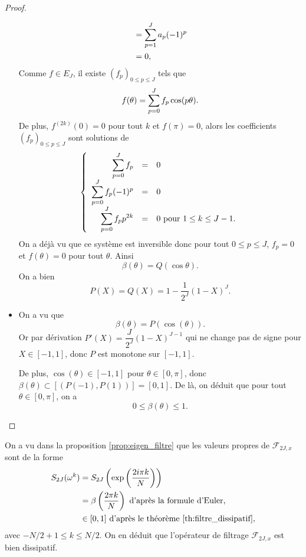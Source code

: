 \begin{proof}
\begin{itemize}
\begin{align*}
	& = \displaystyle\sum\limits_{p=1}^J a_p(-1)^p \\
	& = 0,
\end{align*}
Comme $f \in E_J$, il existe $(f_p)_{0 \leq p \leq J}$ tels que
\begin{equation}
f(\theta) = \displaystyle\sum\limits_{p=0}^J f_p \cos (p \theta).
\end{equation}
De plus, $f^{(2k)}(0)=0$ pour tout $k$ et $f(\pi)=0$, alors les coefficients $(f_p)_{0 \leq p \leq J}$ sont solutions de 
\begin{equation}
\left\lbrace
\begin{array}{rcl}
\displaystyle\sum\limits_{p=0}^J f_p & = & 0 \\
\displaystyle\sum\limits_{p=0}^J f_p (-1)^p & = & 0 \\
\displaystyle\sum\limits_{p=0}^J f_p p^{2k} & = & 0 \text{ pour } 1 \leq k \leq J-1.
\end{array}
\right.
\end{equation}
On a déjà vu que ce système est inversible donc pour tout $0 \leq p \leq J$, $f_p = 0$ et $f(\theta) = 0$ pour tout $\theta$. Ainsi 
\begin{equation}
\beta(\theta) = Q(\cos\theta).
\end{equation}
On a bien
\begin{equation}
P(X) = Q(X) = 1-\dfrac{1}{2^J}(1-X)^J.
\end{equation}

\item On a vu que
\begin{equation}
\beta(\theta) = P(\cos (\theta)).
\end{equation}
Or par dérivation $P'(X) =  \dfrac{J}{2^J}(1-X)^{J-1}$ qui ne change pas de signe pour $X \in [-1,1]$, donc $P$ est monotone sur $[-1,1]$.

De plus, $\cos(\theta) \in [-1,1]$ pour $\theta \in [0, \pi]$, donc $\beta(\theta) \subset [(P(-1), P(1))] = [0,1]$. De là, on déduit que pour tout $\theta \in [0,\pi]$, on a
\begin{equation}
0 \leq \beta(\theta) \leq 1.
\end{equation} 
\end{itemize}
\end{proof}

\begin{remarque}
On a vu dans la proposition \ref{prop:eigen_filtre} que les valeurs propres de $\mathcal{F}_{2J,x}$ sont de la forme
\begin{align*}
S_{2J}(\omega^k) & = S_{2J}\left(\exp \left( \dfrac{2 i \pi k}{N} \right) \right) \\
	& = \beta \left(\dfrac{2 \pi k}{N} \right) \text{ d'après la formule d'Euler,}\\
	& \in [0,1] \text{ d'après le théorème } \ref{th:filtre_dissipatif},
\end{align*}
avec $-N/2+1 \leq k \leq N/2$. On en déduit que l'opérateur de filtrage $\mathcal{F}_{2J,x}$ est bien dissipatif.
\end{remarque}

